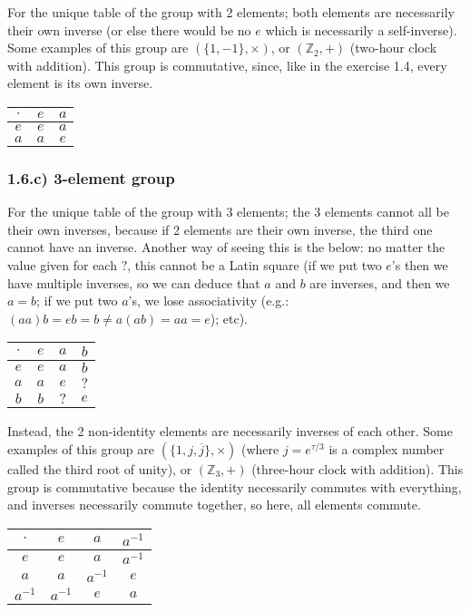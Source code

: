 For the unique table of the group with 2 elements; both elements are necessarily their own inverse (or else there would be no $e$ which is necessarily a self-inverse). Some examples of this group are $(\{ 1, -1 \}, \times)$, or $(\mathbb{Z}_2, +)$ (two-hour clock with addition). This group is commutative, since, like in the exercise 1.4, every element is its own inverse.

\begin{tabular}{|c||c|c|}
\hline
$\cdot$ & $e$ & $a$ \\ \hline \hline
$e    $ & $e$ & $a$ \\ \hline
$a    $ & $a$ & $e$ \\ \hline
\end{tabular}


\subsubsection*{1.6.c) 3-element group}

For the unique table of the group with 3 elements; the 3 elements cannot all be their own inverses, because if 2 elements are their own inverse, the third one cannot have an inverse. Another way of seeing this is the below: no matter the value given for each $?$, this cannot be a Latin square (if we put two $e$'s then we have multiple inverses, so we can deduce that $a$ and $b$ are inverses, and then we $a = b$; if we put two $a$'s, we lose associativity (e.g.: $(aa)b = eb = b \ne a(ab) = aa = e$); etc).

\begin{tabular}{|c||c|c|c|}
\hline
$\cdot$ & $e$ & $a$ & $b$ \\ \hline \hline
$e    $ & $e$ & $a$ & $b$ \\ \hline
$a    $ & $a$ & $e$ & $?$ \\ \hline
$b    $ & $b$ & $?$ & $e$ \\ \hline
\end{tabular}

Instead, the 2 non-identity elements are necessarily inverses of each other. Some examples of this group are $(\{1, j, \overline{j} \}, \times)$ (where $j = e^{\tau / 3}$ is a complex number called the third root of unity), or $(\mathbb{Z}_3, +)$ (three-hour clock with addition). This group is commutative because the identity necessarily commutes with everything, and inverses necessarily commute together, so here, all elements commute.

\begin{tabular}{|c||c|c|c|}
\hline
$\cdot $ & $e     $ & $a     $ & $a^{-1}$ \\ \hline \hline
$e     $ & $e     $ & $a     $ & $a^{-1}$ \\ \hline
$a     $ & $a     $ & $a^{-1}$ & $e     $ \\ \hline
$a^{-1}$ & $a^{-1}$ & $e     $ & $a     $ \\ \hline
\end{tabular}



